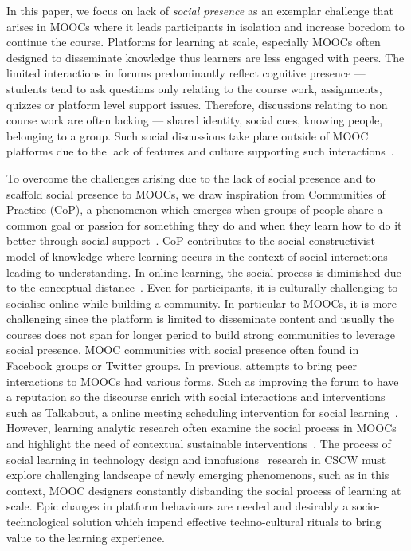 \documentclass[format=acmsmall, review=false, screen=true]{acmart}
\begin{document}
In this paper, we focus on lack of \textit{social presence} as an exemplar challenge that arises in MOOCs where it leads participants in isolation and increase boredom to continue the course. Platforms for learning at scale, especially MOOCs often designed to disseminate knowledge thus learners are less engaged with peers. The limited interactions in forums predominantly reflect cognitive presence --- students tend to ask questions only relating to the course work, assignments, quizzes or platform level support issues. Therefore, discussions relating to non course work are often lacking --- shared identity, social cues, knowing people, belonging to a group. Such social discussions take place outside of MOOC platforms due to the lack of features and culture supporting such interactions~\cite{veletsianos2015digging}. 

To overcome the challenges arising due to the lack of social presence and to scaffold social presence to MOOCs, we draw inspiration from Communities of Practice (CoP), a phenomenon which emerges when groups of people share a common goal or passion for something they do and when they learn how to do it better through social support~\cite{wenger1999communities}. CoP contributes to the social constructivist model of knowledge where learning occurs in the context of social interactions leading to understanding. In online learning, the social process is diminished due to the conceptual distance~\cite{olson2000distance}. Even for participants, it is culturally challenging to socialise online while building a community. In particular to MOOCs, it is more challenging since the platform is limited to disseminate content and usually the courses does not span for longer period to build strong communities to leverage social presence. MOOC communities with social presence often found in Facebook groups or Twitter groups. In previous, attempts to bring peer interactions to MOOCs had various forms. Such as improving the forum to have a reputation so the discourse enrich with social interactions and interventions such as Talkabout, a online meeting scheduling intervention for social learning~\cite{kulkarni2015talkabout}. However, learning analytic research often examine the social process in MOOCs and highlight the need of contextual sustainable interventions~\cite{poquet2018mooc}. The process of social learning in technology design and innofusions~\cite{williams2005social} research in CSCW must explore challenging landscape of newly emerging phenomenons, such as in this context, MOOC designers constantly disbanding the social process of learning at scale. Epic changes in platform behaviours are needed and desirably a socio-technological solution which impend effective techno-cultural rituals to bring value to the learning experience. 
\end{document}
